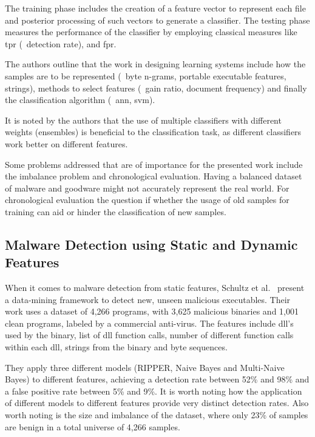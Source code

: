 The training phase includes the creation of a feature vector to represent each file and posterior processing of such vectors to generate a classifier.
The testing phase measures the performance of the classifier by employing classical measures like \gls{tpr} (\ie\ detection rate), and \gls{fpr}.

The authors outline that the work in designing learning systems include how the samples are to be represented (\eg\ byte n-grams, portable executable features, strings), methods to select features (\eg\ gain ratio, document frequency) and finally the classification algorithm (\eg\ \gls{ann}, \gls{svm}).

It is noted by the authors that the use of multiple classifiers with different weights (ensembles) is beneficial to the classification task, as different classifiers work better on different features.

Some problems addressed that are of importance for the presented work include the imbalance problem and chronological evaluation.
Having a balanced dataset of malware and goodware might not accurately represent the real world.
For chronological evaluation the question if whether the usage of old samples for training can aid or hinder the classification of new samples.

\subsection{Malware Detection using Static and Dynamic Features}

When it comes to malware detection from static features, Schultz et al.~\cite{schultz:data_mining} present a data-mining framework to detect new, unseen malicious executables.
Their work uses a dataset of 4,266 programs, with 3,625 malicious binaries and 1,001 clean programs, labeled by a commercial anti-virus.
The features include \gls{dll}'s used by the binary, list of \gls{dll} function calls, number of different function calls within each \gls{dll}, strings from the binary and byte sequences.

They apply three different models (RIPPER, Naive Bayes and Multi-Naive Bayes) to different features, achieving a detection rate between 52\% and 98\% and a false positive rate between 5\% and 9\%.
It is worth noting how the application of different models to different features provide very distinct detection rates.
Also worth noting is the size and imbalance of the dataset, where only 23\% of samples are benign in a total universe of 4,266 samples.

